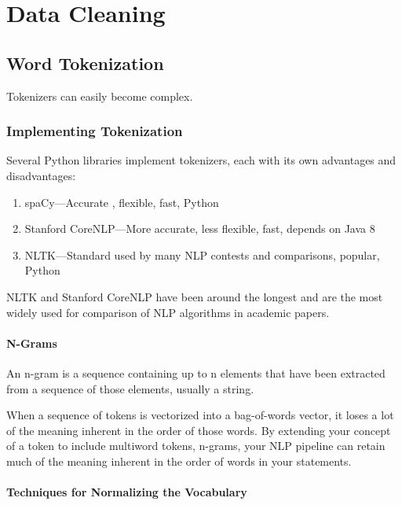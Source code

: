 \documentclass[
]{book}
\begin{document}
\hypertarget{data-cleaning}{%
\chapter{Data Cleaning}\label{data-cleaning}}

\hypertarget{word-tokenization}{%
\section{Word Tokenization}\label{word-tokenization}}

Tokenizers can easily become complex.

\hypertarget{implementing-tokenization}{%
\subsection{Implementing Tokenization}\label{implementing-tokenization}}

Several Python libraries implement tokenizers, each with its own advantages and disadvantages:

\begin{enumerate}
\def\labelenumi{\arabic{enumi}.}
\item
  spaCy---Accurate , flexible, fast, Python
\item
  Stanford CoreNLP---More accurate, less flexible, fast, depends on Java 8
\item
  NLTK---Standard used by many NLP contests and comparisons, popular, Python
\end{enumerate}

NLTK and Stanford CoreNLP have been around the longest and are the most widely used for comparison of NLP algorithms in academic papers.

\hypertarget{n-grams}{%
\subsubsection{N-Grams}\label{n-grams}}

An n-gram is a sequence containing up to n elements that have been extracted from a sequence of those elements, usually a string.

When a sequence of tokens is vectorized into a bag-of-words vector, it loses a lot of the meaning inherent in the order of those words. By extending your concept of a token to include multiword tokens, n-grams, your NLP pipeline can retain much of the meaning inherent in the order of words in your statements.

\hypertarget{techniques-for-normalizing-the-vocabulary}{%
\subsubsection{Techniques for Normalizing the Vocabulary}\label{techniques-for-normalizing-the-vocabulary}}
\end{document}
